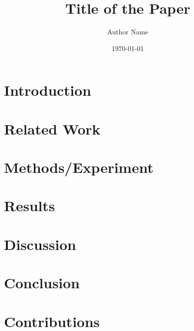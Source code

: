 \documentclass{article}
\begin{document}
\title{Title of the Paper}
\author{Author Name}
\date{\today}
\maketitle

\begin{abstract}
\end{abstract}

\section{Introduction}

\section{Related Work}

\section{Methods/Experiment}

\section{Results}

\section{Discussion}

\section{Conclusion}

\section{Contributions}



\end{document}
